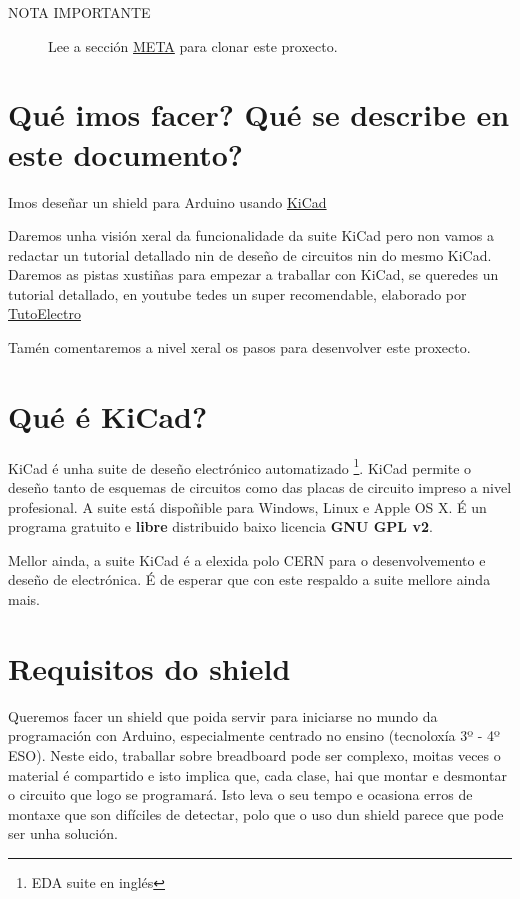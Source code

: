 \begin{description}
\item[NOTA IMPORTANTE]
Lee a sección \hyperref[meta]{META} para clonar este proxecto.
\end{description}

\section{Qué imos facer? Qué se describe en este
documento?}\label{quuxe9-imos-facer-quuxe9-se-describe-en-este-documento}

Imos deseñar un shield para Arduino usando
\href{http://www.kicad-pcb.org/}{KiCad}

Daremos unha visión xeral da funcionalidade da suite KiCad pero non
vamos a redactar un tutorial detallado nin de deseño de circuitos nin do
mesmo KiCad. Daremos as pistas xustiñas para empezar a traballar con
KiCad, se queredes un tutorial detallado, en youtube tedes un super
recomendable, elaborado por
\href{https://www.youtube.com/playlist?list=PL1Hs_F1k2mdRVYDtdWd7tQKDZTfxop7np}{TutoElectro}

Tamén comentaremos a nivel xeral os pasos para desenvolver este
proxecto.

\section{Qué é KiCad?}\label{quuxe9-uxe9-kicad}

KiCad é unha suite de deseño electrónico automatizado \footnote{EDA
  suite en inglés}. KiCad permite o deseño tanto de esquemas de
circuitos como das placas de circuito impreso a nivel profesional. A
suite está dispoñible para Windows, Linux e Apple OS X. É un programa
gratuito e \textbf{libre} distribuido baixo licencia \textbf{GNU GPL
v2}.

Mellor ainda, a suite KiCad é a elexida polo CERN para o desenvolvemento
e deseño de electrónica. É de esperar que con este respaldo a suite
mellore ainda mais.

\section{Requisitos do shield}\label{requisitos-do-shield}

Queremos facer un shield que poida servir para iniciarse no mundo da
programación con Arduino, especialmente centrado no ensino (tecnoloxía
3º - 4º ESO). Neste eido, traballar sobre breadboard pode ser complexo,
moitas veces o material é compartido e isto implica que, cada clase, hai
que montar e desmontar o circuito que logo se programará. Isto leva o
seu tempo e ocasiona erros de montaxe que son difíciles de detectar,
polo que o uso dun shield parece que pode ser unha solución.


